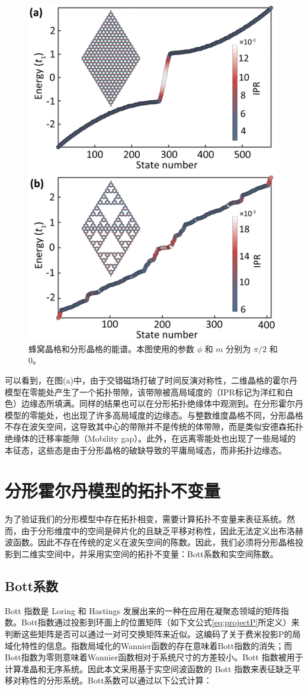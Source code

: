 \begin{figure}[htbp]
    \centering
    \includegraphics[width=0.45\linewidth]{figure/FracHaldTheo/HaldSPec.png}
    \caption{蜂窝晶格和分形晶格的能谱。本图使用的参数 $\phi$ 和 $m$ 分别为 $\pi/2$ 和 $0$。}
    \label{fig:HaldSPec}
\end{figure}

可以看到，在图(a)中，由于交错磁场打破了时间反演对称性，二维晶格的霍尔丹模型在零能处产生了一个拓扑带隙，该带隙被高局域度的（IPR标记为洋红和白色）边缘态所填满。同样的结果也可以在分形拓扑绝缘体中观测到。在分形霍尔丹模型的零能处，也出现了许多高局域度的边缘态。与整数维度晶格不同，分形晶格不存在波矢空间，这导致其中心的带隙并不是传统的体带隙，而是类似安德森拓扑绝缘体的迁移率能隙（Mobility gap）。此外，在远离零能处也出现了一些局域的本征态，这些态是由于分形晶格的破缺导致的平庸局域态，而非拓扑边缘态。
\section{分形霍尔丹模型的拓扑不变量}
为了验证我们的分形模型中存在拓扑相变，需要计算拓扑不变量来表征系统。然而，由于分形维度中的空间是碎片化的且缺乏平移对称性，因此无法定义出布洛赫波函数。因此不存在传统的定义在波矢空间的陈数。因此，我们必须将分形晶格投影到二维实空间中，并采用实空间的拓扑不变量：Bott系数\cite{titum2015disorder,wang2020bosonic}和实空间陈数\cite{mitchell2018amorphous}。
\subsection{Bott系数}
Bott 指数是 Loring 和 Hastings 发展出来的一种在应用在凝聚态领域的矩阵指数\cite{hastings2010almost,hastings2011topological}。Bott指数通过投影到环面上的位置矩阵（如下文公式\ref{eq:projectP}所定义）来判断这些矩阵是否可以通过一对可交换矩阵来近似。这编码了关于费米投影P的局域化特性的信息。指数局域化的Wannier函数的存在意味着Bott指数的消失；而Bott指数为零则意味着Wannier函数相对于系统尺寸的方差较小\cite{hastings2011topological}。Bott 指数被用于计算准晶\cite{huang2018quantum}和无序系统\cite{wang2020bosonic}。因此本文采用基于实空间波函数的 Bott 指数来表征缺乏平移对称性的分形系统。Bott系数可以通过以下公式计算\cite{titum2015disorder,wang2020bosonic}：

